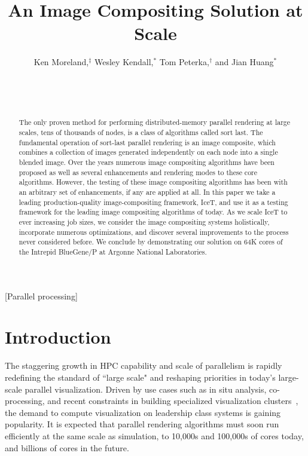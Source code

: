 \documentclass{sig-alternate}
\title{An Image Compositing Solution at Scale}
\author{
\alignauthor
Ken Moreland,$^{\ddagger}$ Wesley Kendall,$^{*}$ Tom Peterka,$^{\dagger}$ and Jian Huang$^{*}$\\
    \affaddr{$^\ddagger$Sandia National Laboratory}\\
    \affaddr{$^*$University of Tennessee, Knoxville}\\
    \affaddr{$^\dagger$Argonne National Laboratory}\\
}
\newcommand*{\lcite}[1]{~\cite{#1}}
\begin{document}
\sloppy

\maketitle

\begin{abstract}
  The only proven method for performing distributed-memory parallel
  rendering at large scales, tens of thousands of nodes, is a class of
  algorithms called sort last.  The fundamental operation of sort-last
  parallel rendering is an image composite, which combines a collection of
  images generated independently on each node into a single blended image.
  Over the years numerous image compositing algorithms have been proposed
  as well as several enhancements and rendering modes to these core
  algorithms.  However, the testing of these image compositing algorithms
  has been with an arbitrary set of enhancements, if any are applied at
  all.  In this paper we take a leading production-quality
  image-compositing framework, IceT, and use it as a testing framework for
  the leading image compositing algorithms of today.  As we scale IceT to
  ever increasing job sizes, we consider the image compositing systems
  holistically, incorporate numerous optimizations, and discover several
  improvements to the process never considered before.  We conclude by
  demonstrating our solution on 64K cores of the Intrepid BlueGene/P at
  Argonne National Laboratories.
\end{abstract}


[Parallel processing]


\section{Introduction} 
\label{sec:Introduction}

The staggering growth in HPC capability and scale of parallelism is rapidly 
redefining the standard of ``large scale" and reshaping priorities 
in today's large-scale parallel visualization.
Driven by use cases such as in situ analysis, co-processing, and
recent constraints in building specialized visualization 
clusters\lcite{Childs2007}, the demand to compute visualization 
on leadership class systems is gaining popularity.
It is expected that parallel rendering algorithms must soon run efficiently 
at the same scale as simulation, to 10,000s and 100,000s of cores 
today, and billions of cores in the future.
\end{document}
